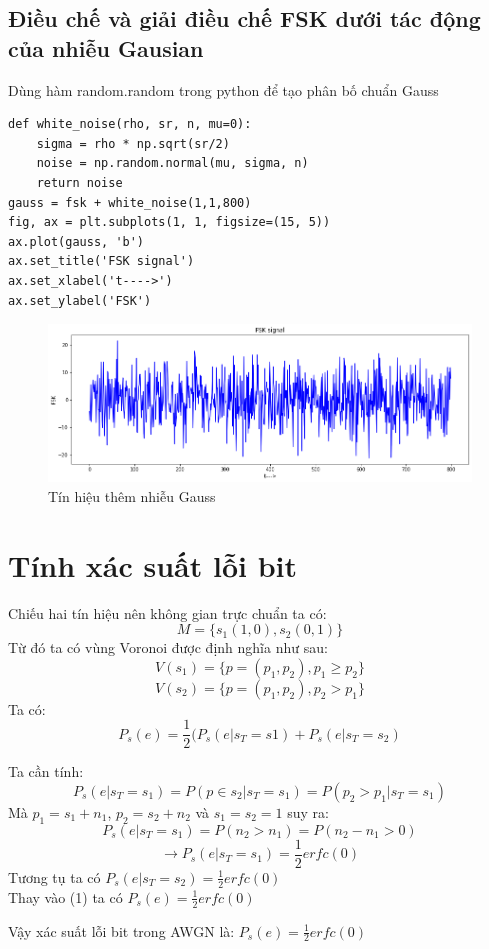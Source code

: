 \subsection{Điều chế và giải điều chế FSK dưới tác động của nhiễu Gausian}
Dùng hàm random.random trong python để tạo phân bố chuẩn Gauss
\begin{lstlisting}
def white_noise(rho, sr, n, mu=0):
    sigma = rho * np.sqrt(sr/2)
    noise = np.random.normal(mu, sigma, n)
    return noise
gauss = fsk + white_noise(1,1,800)
fig, ax = plt.subplots(1, 1, figsize=(15, 5))
ax.plot(gauss, 'b')
ax.set_title('FSK signal')
ax.set_xlabel('t---->')
ax.set_ylabel('FSK')

\end{lstlisting}
\begin{center}
    \begin{figure}[htp]
    \begin{center}
     \includegraphics[scale=.5]{Img/add_gauss_signal.png}
    \end{center}
    \caption{Tín hiệu thêm nhiễu Gauss}
    \label{refhinh1}
    \end{figure}
\end{center}
\newpage
\section{Tính xác suất lỗi bit}
Chiếu hai tín hiệu nên không gian trực chuẩn ta có:
\[ M = \{ s_1(1,0), s_2(0,1) \} \]
Từ đó ta có vùng Voronoi được định nghĩa như sau:
\[ V(s_1) = \{  p = (p_1,p_2), p_1 \ge p_2 \} \]
\[ V(s_2) = \{  p = (p_1,p_2), p_2>p_1 \} \]
Ta có:
\begin{equation}
	P_s(e) = \frac{1}{2} (P_s(e|s_T = s1) + P_s(e|s_T = s_2)  
\end{equation}
 
Ta cần tính:
\[  P_s(e|s_T = s_1) = P(p \in s_2 | s_T = s_1) = P(p_2 > p_1 | s_T = s_1)\]
Mà $ p_1 = s_1 + n_1 $, $ p_2 = s_2 + n_2  $ và $s_1 = s_2 = 1$ suy ra:
\[ P_s(e|s_T = s_1) = P(n_2 > n_1) = P(n_2 - n_1 > 0)\]
\[ \rightarrow P_s(e|s_T = s_1) = \frac{1}{2} erfc(0) \]
Tương tụ ta có 
$P_s(e|s_T = s_2) = \frac{1}{2} erfc(0) $ \\
Thay vào (1) ta có $P_s(e) = \frac{1}{2} erfc(0)$

Vậy xác suất lỗi bit trong AWGN là: $P_s(e) = \frac{1}{2} erfc(0)$
